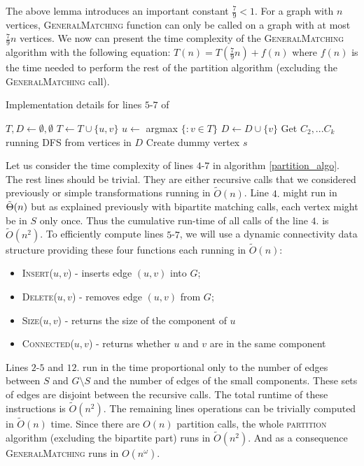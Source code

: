 The above lemma introduces an important constant $\frac{7}{9}<1$. For a graph with $n$ vertices, \textsc{GeneralMatching} function can only be called on a graph with at most $\frac{7}{9}n$ vertices. We now can present the time complexity of the \textsc{GeneralMatching} algorithm with the following equation: $T(n)=T(\frac{7}{9}n)+f(n)$ where $f(n)$ is the time needed to perform the rest of the partition algorithm (excluding the \textsc{GeneralMatching} call).

\begin{algorithm}[htbp]
\caption{Implementation details for lines $5$-$7$ of }
\begin{algorithmic}[1]
\State $T,D \gets \emptyset, \emptyset$
    \State {}
    \State $T \gets T \cup \{u, v\}$
\EndFor
\State $u \gets$ argmax $\{$$ \colon v\in T\}$
    \State $D \gets D\cup\{v\}$
\EndIf
\EndFor
\State Get $C_2,...C_k$ running DFS from vertices in $D$
\State Create dummy vertex $s$
    \State {}
\EndFor
\end{algorithmic}
\end{algorithm}

Let us consider the time complexity of lines $4$-$7$ in algorithm \ref{partition_algo}. The rest lines should be trivial. They are either recursive calls that we considered previously or simple transformations running in $\tilde O(n)$.
Line $4.$ might run in $\Tilde{\Theta}(n)$ but as explained previously with bipartite matching calls, each vertex might be in $S$ only once. Thus the cumulative run-time of all calls of the line $4.$ is $\tilde O(n^2)$. To efficiently compute lines $5$-$7$, we will use a dynamic connectivity data structure \cite{dynamic_components} providing these four functions each running in $\tilde O(n)$:
\begin{itemize}
    \item \textsc{Insert($u,v$)} - inserts edge $(u,v)$ into $G$;
    \item \textsc{Delete($u,v$)} - removes edge $(u,v)$ from $G$;
    \item \textsc{Size($u,v$)} - returns the size of the component of $u$
    \item \textsc{Connected($u,v$)} - returns whether $u$ and $v$ are in the same component 
\end{itemize}

Lines $2$-$5$ and $12.$ run in the time proportional only to the number of edges between $S$ and $G\setminus S$ and the number of edges of the small components. These sets of edges are disjoint between the recursive calls. The total runtime of these instructions is $\tilde O(n^2)$. The remaining lines operations can be trivially computed in $\tilde O(n)$ time. Since there are $O(n)$ partition calls, the whole \textsc{partition} algorithm (excluding the bipartite part) runs in $\tilde O(n^2)$. And as a consequence \textsc{GeneralMatching} runs in $O(n^\omega)$.
